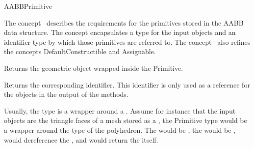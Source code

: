 \ccRefPageBegin


\begin{ccRefConcept}{AABBPrimitive}


\ccDefinition
  
The concept \ccRefName\ describes the requirements for the primitives stored in the AABB data structure. The concept encapsulates a type for the input objects and an identifier type by which those primitives are referred to. The concept \ccRefName\ also refines the concepts DefaultConstructible and Assignable.

\ccTypes





\ccOperations

{Returns the geometric object wrapped inside the Primitive.}

{Returns the corresponding identifier. This identifier is only used as a reference for the objects in the output of the  methods.}


\ccSeeAlso
{}

\ccExample

Usually, the  type is a wrapper around a . Assume for instance that the input objects are the triangle faces of a mesh stored as a , the Primitive type would be a wrapper around the   type of the polyhedron. The  would be ,
 the  would be ,  would dereference the , and  would return the  itself. 

\end{ccRefConcept}

\ccRefPageEnd

